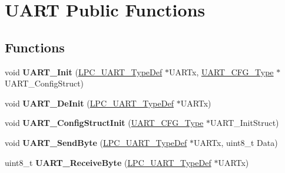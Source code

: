 \hypertarget{group___u_a_r_t___public___functions}{\section{\-U\-A\-R\-T \-Public \-Functions}
\label{group___u_a_r_t___public___functions}
}
\subsection*{\-Functions}
\begin{DoxyCompactItemize}
\item 
\hypertarget{group___u_a_r_t___public___functions_ga38648a309b0eb01e488f593f93fd9e02}{void {\bfseries \-U\-A\-R\-T\-\_\-\-Init} (\hyperlink{struct_l_p_c___u_a_r_t___type_def}{\-L\-P\-C\-\_\-\-U\-A\-R\-T\-\_\-\-Type\-Def} $\ast$\-U\-A\-R\-Tx, \hyperlink{struct_u_a_r_t___c_f_g___type}{\-U\-A\-R\-T\-\_\-\-C\-F\-G\-\_\-\-Type} $\ast$\-U\-A\-R\-T\-\_\-\-Config\-Struct)}\label{group___u_a_r_t___public___functions_ga38648a309b0eb01e488f593f93fd9e02}

\item 
\hypertarget{group___u_a_r_t___public___functions_ga3074f639a2a3de38e5d0129c8ba113b4}{void {\bfseries \-U\-A\-R\-T\-\_\-\-De\-Init} (\hyperlink{struct_l_p_c___u_a_r_t___type_def}{\-L\-P\-C\-\_\-\-U\-A\-R\-T\-\_\-\-Type\-Def} $\ast$\-U\-A\-R\-Tx)}\label{group___u_a_r_t___public___functions_ga3074f639a2a3de38e5d0129c8ba113b4}

\item 
\hypertarget{group___u_a_r_t___public___functions_gab27415db995bfdbcd9984073833053d9}{void {\bfseries \-U\-A\-R\-T\-\_\-\-Config\-Struct\-Init} (\hyperlink{struct_u_a_r_t___c_f_g___type}{\-U\-A\-R\-T\-\_\-\-C\-F\-G\-\_\-\-Type} $\ast$\-U\-A\-R\-T\-\_\-\-Init\-Struct)}\label{group___u_a_r_t___public___functions_gab27415db995bfdbcd9984073833053d9}

\item 
\hypertarget{group___u_a_r_t___public___functions_gaed06c5f6548091cba78b88700b82ad62}{void {\bfseries \-U\-A\-R\-T\-\_\-\-Send\-Byte} (\hyperlink{struct_l_p_c___u_a_r_t___type_def}{\-L\-P\-C\-\_\-\-U\-A\-R\-T\-\_\-\-Type\-Def} $\ast$\-U\-A\-R\-Tx, uint8\-\_\-t \-Data)}\label{group___u_a_r_t___public___functions_gaed06c5f6548091cba78b88700b82ad62}

\item 
\hypertarget{group___u_a_r_t___public___functions_gafbb690c2811d921f8c733888fdbfef54}{uint8\-\_\-t {\bfseries \-U\-A\-R\-T\-\_\-\-Receive\-Byte} (\hyperlink{struct_l_p_c___u_a_r_t___type_def}{\-L\-P\-C\-\_\-\-U\-A\-R\-T\-\_\-\-Type\-Def} $\ast$\-U\-A\-R\-Tx)}\label{group___u_a_r_t___public___functions_gafbb690c2811d921f8c733888fdbfef54}


\end{DoxyCompactItemize}
